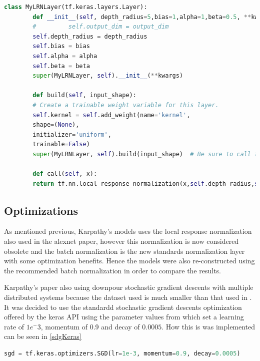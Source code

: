 \documentclass[10pt,phd,a4paper,oneside]{article}
\begin{document}
    \begin{lstlisting}[language=Python, caption=Local response normalization layer implemetation, label=lrn]
        class MyLRNLayer(tf.keras.layers.Layer):
        def __init__(self, depth_radius=5,bias=1,alpha=1,beta=0.5, **kwargs):
        #         self.output_dim = output_dim
        self.depth_radius = depth_radius
        self.bias = bias
        self.alpha = alpha
        self.beta = beta
        super(MyLRNLayer, self).__init__(**kwargs)

        def build(self, input_shape):
        # Create a trainable weight variable for this layer.
        self.kernel = self.add_weight(name='kernel',
        shape=(None),
        initializer='uniform',
        trainable=False)
        super(MyLRNLayer, self).build(input_shape)  # Be sure to call this at the end

        def call(self, x):
        return tf.nn.local_response_normalization(x,self.depth_radius,self.bias,self.alpha,self.beta)
    \end{lstlisting}


    \subsection{Optimizations}

    As mentioned previous, Karpathy's models uses the local response normalization \cite{ROBINSON20071631} also used in the alexnet paper\cite{NIPS2012_4824}, however this normalization is now considered obsolete and the batch normalization \cite{ioffe2015batch} is the new standards normalization layer with some optimization benefits. Hence the models were also re-constructed using the recommended batch normalization in order to compare the results.

    Karpathy's paper also using downpour stochastic gradient descents with multiple distributed systems because the dataset used is much smaller than that used in \citep{KarpathyCVPR14}. It was decided to use the standardd stochastic gradient descents optimization offered by the keras API using the parameter values from \citep{KarpathyCVPR14} which set a learning rate of $1e^-3$, momentum of 0.9 and decay of $0.0005$. How this is was implemented can be seen in \ref{sdgKeras}

    \begin{lstlisting}[language=Python, caption=Keras SGD optimization, label=sdgKeras]
        sgd = tf.keras.optimizers.SGD(lr=1e-3, momentum=0.9, decay=0.0005)
    \end{lstlisting}
\end{document}
